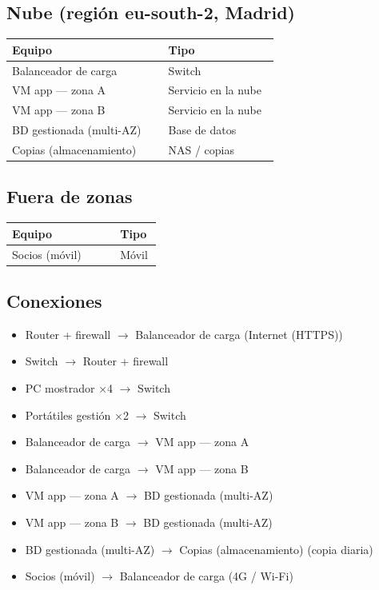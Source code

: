 \documentclass[11pt,a4paper]{article}
\begin{document}
\subsection*{Nube (región eu-south-2, Madrid)}

{\small
\begin{longtable}{@{}>{\raggedright\arraybackslash}p{0.551\linewidth}>{\raggedright\arraybackslash}p{0.398\linewidth}@{}}
\toprule
\textbf{Equipo} & \textbf{Tipo} \\
\midrule
\endhead
Balanceador de carga & Switch \\
VM app — zona A & Servicio en la nube \\
VM app — zona B & Servicio en la nube \\
BD gestionada (multi-AZ) & Base de datos \\
Copias (almacenamiento) & NAS / copias \\
\bottomrule
\end{longtable}}

\subsection*{Fuera de zonas}

{\small
\begin{longtable}{@{}>{\raggedright\arraybackslash}p{0.686\linewidth}>{\raggedright\arraybackslash}p{0.263\linewidth}@{}}
\toprule
\textbf{Equipo} & \textbf{Tipo} \\
\midrule
\endhead
Socios (móvil) & Móvil \\
\bottomrule
\end{longtable}}

\subsection*{Conexiones}

\begin{itemize}
\item Router + firewall $\rightarrow$ Balanceador de carga (Internet (HTTPS))
\item Switch $\rightarrow$ Router + firewall
\item PC mostrador ×4 $\rightarrow$ Switch
\item Portátiles gestión ×2 $\rightarrow$ Switch
\item Balanceador de carga $\rightarrow$ VM app — zona A
\item Balanceador de carga $\rightarrow$ VM app — zona B
\item VM app — zona A $\rightarrow$ BD gestionada (multi-AZ)
\item VM app — zona B $\rightarrow$ BD gestionada (multi-AZ)
\item BD gestionada (multi-AZ) $\rightarrow$ Copias (almacenamiento) (copia diaria)
\item Socios (móvil) $\rightarrow$ Balanceador de carga (4G / Wi-Fi)
\end{itemize}
\end{document}
